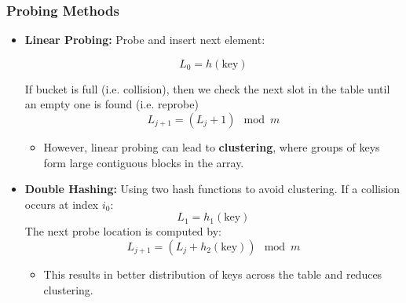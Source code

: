 \subsubsection{Probing Methods}
\begin{definition}
    \begin{itemize}
        \item \textbf{Linear Probing:} Probe and insert next element:
        
        \[
        L_0 = h(\text{key})
        \]
        
        If bucket is full (i.e. collision), then we check the next slot in the table until an empty one is found (i.e. reprobe)
        \[
        L_{j+1} = (L_j + 1) \mod m
        \]
        \begin{itemize}
            \item However, linear probing can lead to \textbf{clustering}, where groups of keys form large contiguous blocks in the array.
        \end{itemize}
    
        \item \textbf{Double Hashing:} Using two hash functions to avoid clustering. If a collision occurs at index \( i_0 \):
        \[
        L_1 = h_1(\text{key}) 
        \]
        The next probe location is computed by:
        \[
        L_{j+1} = (L_j + h_2(\text{key})) \mod m
        \]
        \begin{itemize}
            \item This results in better distribution of keys across the table and reduces clustering.
        \end{itemize}
    \end{itemize}
\end{definition}

